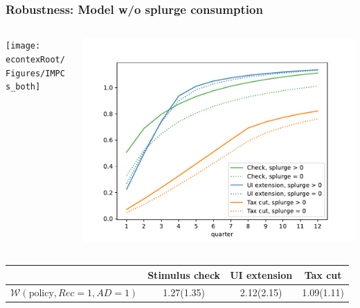 \documentclass[pdflatex,aspectratio=169]{beamer}
\begin{document}
\begin{frame}
\frametitle{Robustness: Model w/o splurge consumption}
\begin{columns}
\begin{column}{0.5\textwidth}
	\texttt{[image: \\econtexRoot/Figures/IMPCs\_both]}
\end{column}
\begin{column}{0.5\textwidth}
	\includegraphics[width=\linewidth]{Code/HA-Models/FromPandemicCode/Figures/Splurge0/Cummulative_multipliers_SplurgeComp}
\end{column}
\end{columns}
\begin{center}
\begin{tabular}{@{}lccc@{}} 
	\toprule 
	& Stimulus check      & UI extension    & Tax cut    \\  \midrule 
	$\mathcal{W}(\text{policy}, Rec=1, AD=1)$ & 1.27(1.35)  & 2.12(2.15)  & 1.09(1.11)     \\ \bottomrule
\end{tabular} 
\end{center}
\end{frame}
\end{document}
